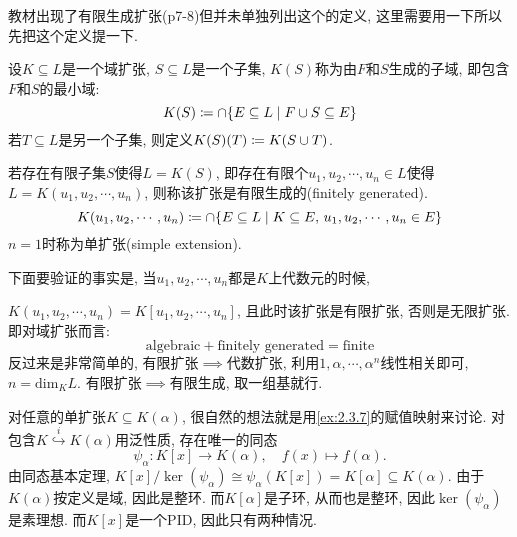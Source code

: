 \begin{remark}
    教材出现了有限生成扩张(p7-8)但并未单独列出这个的定义, 这里需要用一下所以先把这个定义提一下.

    \begin{defstar}
        设$K \subseteq L$是一个域扩张, $S \subseteq L$是一个子集, $K(S)$称为由$F$和$S$生成的子域, 即包含$F$和$S$的最小域:
        \[
            K(S) \mathrel{\coloneqq} \cap \{E \subseteq L \mid F \cup S \subseteq E\} 
        \]
        若$T \subseteq L$是另一个子集, 则定义$K(S)(T) \mathrel{\coloneqq} K(S \cup T)$.

        若存在有限子集$S$使得$L = K(S)$, 即存在有限个$u_1, u_2, \cdots, u_n \in L$使得$L = K(u_1, u_2, \cdots, u_n)$, 则称该扩张是有限生成的(finitely generated).
        \[
            K(u_1, u_2, \cdots, u_n) \mathrel{\coloneqq} \cap \{E \subseteq L \mid K \subseteq E,\, u_1, u_2, \cdots, u_n \in E\}
        \]
        $n = 1$时称为单扩张(simple extension).
    \end{defstar}
    下面要验证的事实是, 当$u_1, u_2, \cdots, u_n$都是$K$上代数元的时候,\par
    $K(u_1, u_2, \cdots, u_n) = K[u_1, u_2, \cdots, u_n]$, 且此时该扩张是有限扩张, 否则是无限扩张. 即对域扩张而言:
    \[
        \text{algebraic} + \text{finitely generated} = \text{finite}
    \]
    反过来是非常简单的, 有限扩张$\implies$代数扩张, 利用$1, \alpha, \cdots, \alpha^n$线性相关即可, $n = \mathrm{dim}_K L$. 有限扩张$\implies$有限生成, 取一组基就行.

    对任意的单扩张$K \subseteq K(\alpha)$, 很自然的想法就是用\ref{ex:2.3.7}的赋值映射来讨论. 对包含$K \overset{i}\hookrightarrow K(\alpha)$用泛性质, 存在唯一的同态 
    \[
        \psi_\alpha:K[x] \to K(\alpha),\quad f(x) \mapsto f(\alpha).
    \]
    由同态基本定理, $K[x]/\ker(\psi_\alpha) \cong \psi_\alpha(K[x]) = K[\alpha] \subseteq K(\alpha)$. 由于$K(\alpha)$按定义是域, 因此是整环. 而$K[\alpha]$是子环, 从而也是整环, 因此$\ker(\psi_\alpha)$是素理想. 而$K[x]$是一个PID, 因此只有两种情况.


\end{remark}
